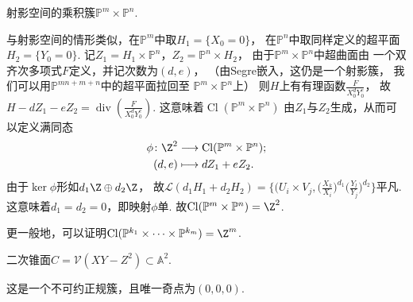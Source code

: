     \begin{example}
        射影空间的乘积簇$\mathbb{P}^{m} \times \mathbb{P}^{n}$. 
        
        与射影空间的情形类似，在$\mathbb{P}^{m}$中取$H_{1}=\{X_{0}=0\}$，
        在$\mathbb{P}^{n}$中取同样定义的超平面$H_{2}=\{Y_{0}=0\}$. 
        记$Z_{1}=H_{1} \times \mathbb{P}^{n}$，$Z_{2}=\mathbb{P}^{n} \times H_{2}$，
        由于$\mathbb{P}^{m} \times \mathbb{P}^{n}$中超曲面由
        一个双齐次多项式$F$定义，并记次数为$(d,e)$，
        （由Segre嵌入，这仍是一个射影簇，
        我们可以用$\mathbb{P}^{mn+m+n}$中的超平面拉回至
        $\mathbb{P}^{m} \times \mathbb{P}^{n}$上）
        则$H$上有有理函数$\frac{F}{X_{0}^{d}Y_{0}^{e}}$，
        故$H-dZ_{1}-eZ_{2}=\operatorname{div}(\frac{F}{X_{0}^{d}Y_{0}^{e}})$.
        这意味着$\operatorname{Cl}(\mathbb{P}^{m}\times\mathbb{P}^{n})$
        由$Z_{1}$与$Z_{2}$生成，从而可以定义满同态
        \begin{equation*}\begin{aligned}
            \phi\colon\Z^{2} &\longrightarrow \operatorname{Cl}(\mathbb{P}^{m}\times\mathbb{P}^{n});
            \\(d,e) &\longmapsto dZ_{1}+eZ_{2}.
        \end{aligned}\end{equation*}
        由于$\ker \phi$形如$d_{1}\Z \oplus d_{2}\Z$，
        故$\mathcal{L}(d_{1}H_{1}+d_{2}H_{2})=
        \{(U_{i} \times V_{j},\big(\frac{X_{k}}{X_{i}}\big)^{d_{1}}\big(\frac{Y_{l}}{Y_{j}}\big)^{d_{2}}\}$平凡.
        这意味着$d_{1}=d_{2}=0$，即映射$\phi$单.
        故$\operatorname{Cl}(\mathbb{P}^{m}\times\mathbb{P}^{n}) = \Z^{2}$.

        更一般地，可以证明$\operatorname{Cl}(\mathbb{P}^{k_{1}}\times\cdots\times\mathbb{P}^{k_{m}})=\Z^{m}$.
    \end{example}

    \begin{example}
        二次锥面$C = \mathcal{V}(XY-Z^{2}) \subset \mathbb{A}^{2}$. \par
        这是一个不可约正规簇，且唯一奇点为$(0,0,0)$.
    \end{example}